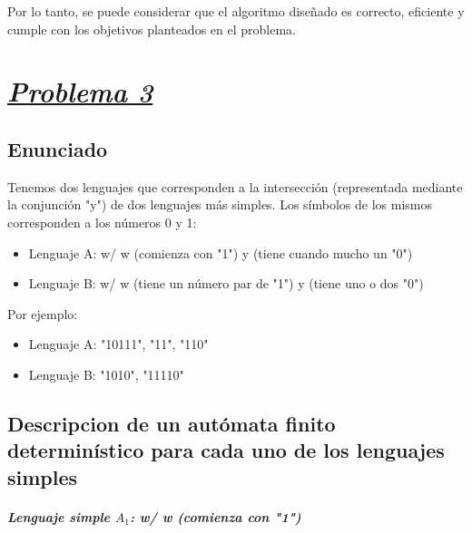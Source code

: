 \documentclass[a4paper, 12pt]{article}
\begin{document}
Por lo tanto, se puede considerar que el algoritmo diseñado es correcto, eficiente y cumple con los objetivos planteados en el problema.




\section{{\uline{\textbf{\textit{Problema 3}}}}}
\subsection{Enunciado}
    Tenemos dos lenguajes que corresponden a la intersección (representada mediante la 
conjunción "y") de dos lenguajes más simples. Los símbolos de los mismos corresponden a 
los números 0 y 1: 

\newline

\begin{itemize}
    \item Lenguaje A: {w/ w (comienza con "1") y (tiene cuando mucho un "0")}
    \item Lenguaje B: {w/ w (tiene un número par de "1") y (tiene uno o dos "0")} 
\end{itemize}

\newline
    Por ejemplo: 
\begin{itemize}
    \item Lenguaje A: "10111", "11", "110"
    \item Lenguaje B: "1010", "11110"
\end{itemize}

\subsection{Descripcion de un autómata finito determinístico para cada uno de los lenguajes simples}

\subparagraph{Lenguaje simple \( A_1 \): {w/ w (comienza con "1")}}
\end{document}
